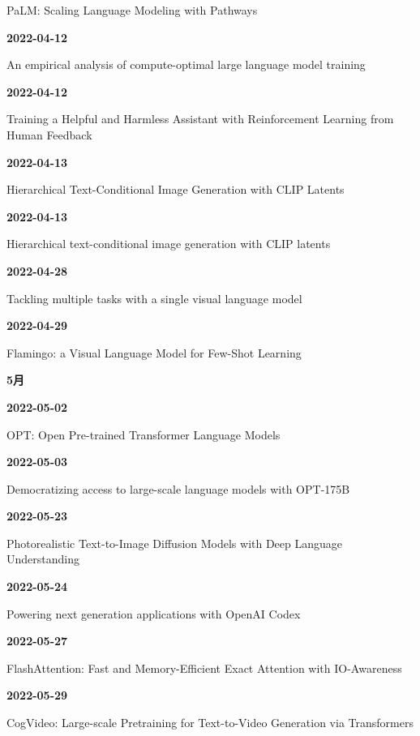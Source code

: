 {\raggedright PaLM: Scaling Language Modeling with Pathways\par}
\smallskip
\noindent\textbf{2022-04-12}\par
{\raggedright An empirical analysis of compute-optimal large language model training\par}
\smallskip
\noindent\textbf{2022-04-12}\par
{\raggedright Training a Helpful and Harmless Assistant with Reinforcement Learning from Human Feedback\par}
\smallskip
\noindent\textbf{2022-04-13}\par
{\raggedright Hierarchical Text-Conditional Image Generation with CLIP Latents\par}
\smallskip
\noindent\textbf{2022-04-13}\par
{\raggedright Hierarchical text-conditional image generation with CLIP latents\par}
\smallskip
\noindent\textbf{2022-04-28}\par
{\raggedright Tackling multiple tasks with a single visual language model\par}
\smallskip
\noindent\textbf{2022-04-29}\par
{\raggedright Flamingo: a Visual Language Model for Few-Shot Learning\par}
\smallskip
\medskip
\noindent\textbf{5月}\par
\smallskip
\noindent\textbf{2022-05-02}\par
{\raggedright OPT: Open Pre-trained Transformer Language Models\par}
\smallskip
\noindent\textbf{2022-05-03}\par
{\raggedright Democratizing access to large-scale language models with OPT-175B\par}
\smallskip
\noindent\textbf{2022-05-23}\par
{\raggedright Photorealistic Text-to-Image Diffusion Models with Deep Language Understanding\par}
\smallskip
\noindent\textbf{2022-05-24}\par
{\raggedright Powering next generation applications with OpenAI Codex\par}
\smallskip
\noindent\textbf{2022-05-27}\par
{\raggedright FlashAttention: Fast and Memory-Efficient Exact Attention with IO-Awareness\par}
\smallskip
\noindent\textbf{2022-05-29}\par
{\raggedright CogVideo: Large-scale Pretraining for Text-to-Video Generation via Transformers\par}
